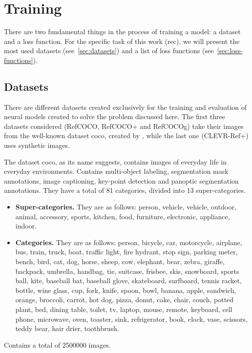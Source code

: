 \section{Training}\label{sec:rec-trainning}

There are two fundamental things in the process of training a model: a dataset
and a loss function. For the specific task of this work (\gls{rec}), we will
present the most used datasets (see\ \vref{sec:datasets}) and a list of loss
functions (see\ \vref{sec:loss-functions}).


\subsection{Datasets}\label{sec:datasets}

There are different datasets created exclusively for the training and
evaluation of neural models created to solve the problem discussed here. The
first three datasets considered (RefCOCO, RefCOCO+ and RefCOCOg) take their
images from the well-known dataset \gls{coco}, created by
, while the last one (CLEVR-Ref+) uses synthetic images.

The dataset \gls{coco}, as its name suggests, contains images of everyday life
in everyday environments. Contains multi-object labeling, segmentation mask
annotations, image captioning, key-point detection and panoptic segmentation
annotations. They have a total of 81 categories, divided into 13
super-categories.
\begin{itemize}
  \item \textbf{Super-categories.} They are as follows: person, vehicle,
  vehicle, outdoor, animal, accessory, sports, kitchen, food, furniture,
  electronic, appliance, indoor.
  \item \textbf{Categories.} They are as follows: person, bicycle, car,
  motorcycle, airplane, bus, train, truck, boat, traffic light, fire hydrant,
  stop sign, parking meter, bench, bird, cat, dog, horse, sheep, cow, elephant,
  bear, zebra, giraffe, backpack, umbrella, handbag, tie, suitcase, frisbee,
  skis, snowboard, sports ball, kite, baseball bat, baseball glove, skateboard,
  surfboard, tennis racket, bottle, wine glass, cup, fork, knife, spoon, bowl,
  banana, apple, sandwich, orange, broccoli, carrot, hot dog, pizza, donut,
  cake, chair, couch, potted plant, bed, dining table, toilet, tv, laptop,
  mouse, remote, keyboard, cell phone, microwave, oven, toaster, sink,
  refrigerator, book, clock, vase, scissors, teddy bear, hair drier,
  toothbrush.
\end{itemize}
Contains a total of \num{2500000} images.

